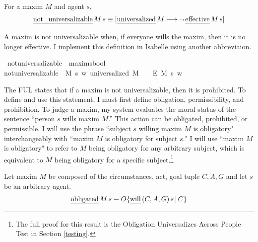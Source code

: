 \begin{isabellebody}
\begin{isamarkuptext}
\begin{definition}
For a maxim $M$ and agent $s$,
$$\text{\emph{not\_universalizable}} \, M \, s  \equiv [ \text{\emph{universalized}} \, M \longrightarrow \neg \, \text{\emph{effective}} \, M \, s ]$$
\end{definition}
\noindent A maxim is not universalizable when, if everyone wills the maxim, then it is no longer 
effective. I implement this definition in Isabelle using another abbreviaion.%
\end{isamarkuptext}\isamarkuptrue%
\isamarkupfalse%
\ not{\isacharunderscore}universalizable\ {\isacharcolon}{\isacharcolon}\ {\isachardoublequoteopen}maxim{\isasymRightarrow}s{\isasymRightarrow}bool{\isachardoublequoteclose}\ \ \isanewline
{\isachardoublequoteopen}not{\isacharunderscore}universalizable\ {\isasymequiv}\ {\isasymlambda}M\ s{\isachardot}\ {\isasymforall}w{\isachardot}\ {\isacharparenleft}{\isacharparenleft}universalized\ M{\isacharparenright}\ \ \isactrlbold {\isasymrightarrow}\ {\isacharparenleft}\isactrlbold {\isasymnot}\ {\isacharparenleft}E\ M\ s{\isacharparenright}{\isacharparenright}{\isacharparenright}\ w{\isachardoublequoteclose}\isanewline
%
%
\begin{isamarkuptext}%
The FUL states that if a maxim is not universalizable, then it is prohibited. To define and use 
this statement, I must first define obligation, permissibility, and prohibition.
To judge a maxim, my system evaluates the moral status of the sentence 
``person $s$ wills maxim $M$.'' This action can be obligated, prohibited, or permissible.
I will use the phrase ``subject $s$ willing maxim $M$ is obligatory" 
interchangeably with ``maxim $M$ is obligatory for subject $s$." I will use ``maxim $M$ is obligatory" to 
refer to $M$ being obligatory for any arbitrary subject, which is equivalent to $M$ being 
obligatory for a specific subject.\footnote{The full proof for this result is the Obligation Universalizes
Across People Test in Section \ref{testing}.}

\begin{definition}[Obligation]

Let maxim $M$ be composed of the circumstances, act, goal tuple $C, A, G$ and let $s$ be an arbitrary agent.
$$\text{\emph{obligated}} \, M \, s \equiv O\{ \text{\emph{will}} \, (C, A, G) \, s \, | \, C\}$$
\end{definition}


\end{isamarkuptext}
\end{isabellebody}
